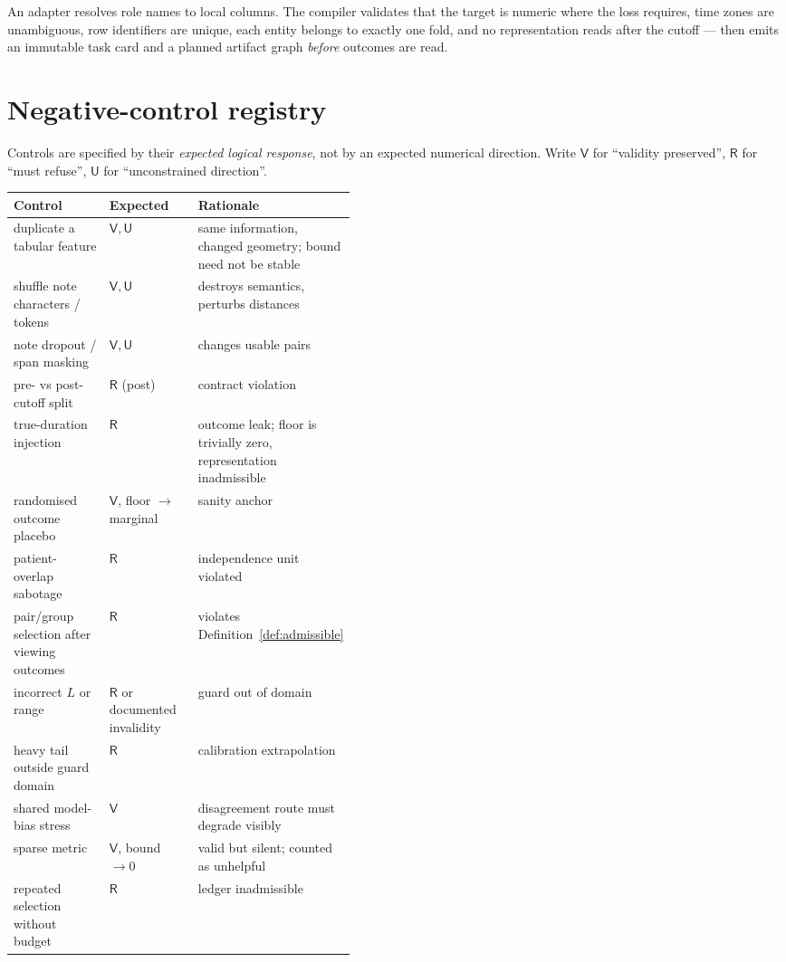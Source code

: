 \documentclass[11pt,a4paper]{article}
\theoremstyle{definition}
\theoremstyle{remark}
\begin{document}
An adapter resolves role names to local columns. The compiler validates that the target is numeric where the loss requires, time zones are unambiguous, row identifiers are unique, each entity belongs to exactly one fold, and no representation reads after the cutoff --- then emits an immutable task card and a planned artifact graph \emph{before} outcomes are read.

\section{Negative-control registry}\label{sec:negctrl}

Controls are specified by their \emph{expected logical response}, not by an expected numerical direction. Write $\mathsf{V}$ for ``validity preserved'', $\mathsf{R}$ for ``must refuse'', $\mathsf{U}$ for ``unconstrained direction''.

\begin{center}
\small
\begin{tabular}{@{}llp{0.44\linewidth}@{}}
\toprule
Control & Expected & Rationale \\
\midrule
duplicate a tabular feature & $\mathsf{V},\mathsf{U}$ & same information, changed geometry; bound need not be stable \\
shuffle note characters / tokens & $\mathsf{V},\mathsf{U}$ & destroys semantics, perturbs distances \\
note dropout / span masking & $\mathsf{V},\mathsf{U}$ & changes usable pairs \\
pre- vs post-cutoff split & $\mathsf{R}$ (post) & contract violation \\
true-duration injection & $\mathsf{R}$ & outcome leak; floor is trivially zero, representation inadmissible \\
randomised outcome placebo & $\mathsf{V}$, floor $\to$ marginal & sanity anchor \\
patient-overlap sabotage & $\mathsf{R}$ & independence unit violated \\
pair/group selection after viewing outcomes & $\mathsf{R}$ & violates Definition~\ref{def:admissible} \\
incorrect $L$ or range & $\mathsf{R}$ or documented invalidity & guard out of domain \\
heavy tail outside guard domain & $\mathsf{R}$ & calibration extrapolation \\
shared model-bias stress & $\mathsf{V}$ & disagreement route must degrade visibly \\
sparse metric & $\mathsf{V}$, bound $\to 0$ & valid but silent; counted as unhelpful \\
repeated selection without budget & $\mathsf{R}$ & ledger inadmissible \\
\bottomrule
\end{tabular}
\end{center}
\end{document}
